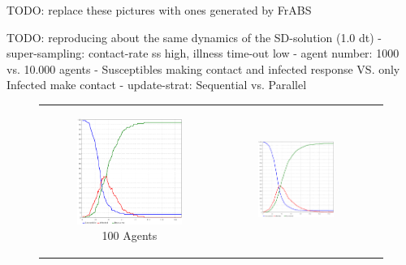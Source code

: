 TODO: replace these pictures with ones generated by FrABS

TODO: reproducing about the same dynamics of the SD-solution (1.0 dt)
	- super-sampling: 	contact-rate ss high, illness time-out low 
	- agent number:		1000 vs. 10.000 agents
	- Susceptibles making contact and infected response VS. only Infected make contact
	- update-strat:		Sequential vs. Parallel
	
\begin{figure}
\begin{center}

	\begin{tabular}{c c c}
		\begin{subfigure}[b]{0.3\textwidth}
			\centering
			\includegraphics[width=.7\textwidth, angle=0]{./../shared/fig/SIR_ABS_ANYLOGIC_100Agents.png}
			\caption{100 Agents}
			\label{fig:pd_seq}
		\end{subfigure}
    	&
		\begin{subfigure}[b]{0.3\textwidth}
			\centering
			\includegraphics[width=.7\textwidth, angle=0]{./../shared/fig/SIR_ABS_ANYLOGIC_1000Agents.png}

\end{subfigure}
\end{tabular}
\end{center}
\end{figure}
